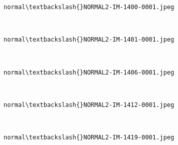 \documentclass[11pt]{article}
\begin{document}
    \begin{Verbatim}[commandchars=\\\{\}]
normal\textbackslash{}NORMAL2-IM-1400-0001.jpeg
    \end{Verbatim}

    \begin{center}
    \end{center}
    { \hspace*{\fill} \\}
    
    \begin{Verbatim}[commandchars=\\\{\}]
normal\textbackslash{}NORMAL2-IM-1401-0001.jpeg
    \end{Verbatim}

    \begin{center}
    \end{center}
    { \hspace*{\fill} \\}
    
    \begin{Verbatim}[commandchars=\\\{\}]
normal\textbackslash{}NORMAL2-IM-1406-0001.jpeg
    \end{Verbatim}

    \begin{center}
    \end{center}
    { \hspace*{\fill} \\}
    
    \begin{Verbatim}[commandchars=\\\{\}]
normal\textbackslash{}NORMAL2-IM-1412-0001.jpeg
    \end{Verbatim}

    \begin{center}
    \end{center}
    { \hspace*{\fill} \\}
    
    \begin{Verbatim}[commandchars=\\\{\}]
normal\textbackslash{}NORMAL2-IM-1419-0001.jpeg
    \end{Verbatim}
\end{document}
